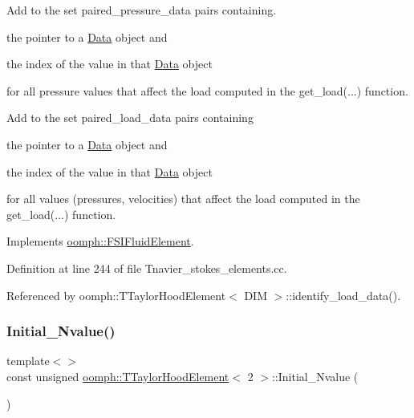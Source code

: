 Add to the set {\ttfamily paired\+\_\+pressure\+\_\+data} pairs containing. 


\begin{DoxyItemize}
\item the pointer to a \hyperlink{classoomph_1_1Data}{Data} object and
\item the index of the value in that \hyperlink{classoomph_1_1Data}{Data} object
\end{DoxyItemize}for all pressure values that affect the load computed in the {\ttfamily get\+\_\+load}(...) function.

Add to the set {\ttfamily paired\+\_\+load\+\_\+data} pairs containing
\begin{DoxyItemize}
\item the pointer to a \hyperlink{classoomph_1_1Data}{Data} object and
\item the index of the value in that \hyperlink{classoomph_1_1Data}{Data} object
\end{DoxyItemize}for all values (pressures, velocities) that affect the load computed in the {\ttfamily get\+\_\+load}(...) function. 

Implements \hyperlink{classoomph_1_1FSIFluidElement_af8e0805b769b7d111eb71f223fc83df8}{oomph\+::\+F\+S\+I\+Fluid\+Element}.



Definition at line 244 of file Tnavier\+\_\+stokes\+\_\+elements.\+cc.



Referenced by oomph\+::\+T\+Taylor\+Hood\+Element$<$ D\+I\+M $>$\+::identify\+\_\+load\+\_\+data().

\mbox{\label{classoomph_1_1TTaylorHoodElement_aa5d902a87683efbc78045e4c01ab3d58}} 
\subsubsection{\texorpdfstring{Initial\+\_\+\+Nvalue()}{Initial\_Nvalue()}\hspace{0.1cm}{\footnotesize\ttfamily [1/2]}}
{\footnotesize\ttfamily template$<$$>$ \\
const unsigned \hyperlink{classoomph_1_1TTaylorHoodElement}{oomph\+::\+T\+Taylor\+Hood\+Element}$<$ 2 $>$\+::Initial\+\_\+\+Nvalue (\begin{DoxyParamCaption}{ }\end{DoxyParamCaption})\hspace{0.3cm}{\ttfamily [private]}}



